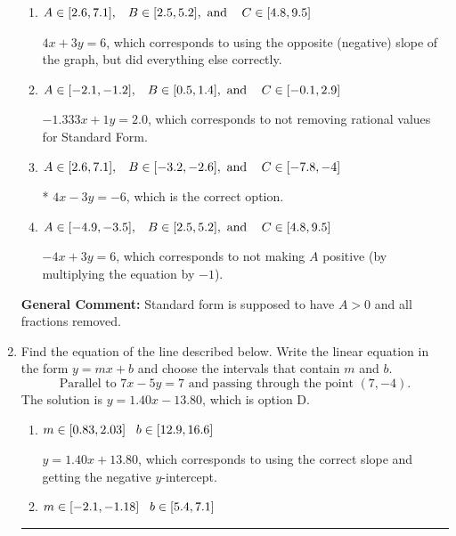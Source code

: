 \documentclass{extbook}[14pt]
\newcommand{\litem}[1]{\item #1

\rule{\textwidth}{0.4pt}}
\begin{document}
\begin{enumerate}
{\begin{enumerate}[label=\Alph*.]
 $-1.333x - 1y = -2.0$, which corresponds to using the opposite (negative) slope of the graph and not removing rational values.
\item \( A \in [2.6, 7.1], \hspace{3mm} B \in [2.5, 5.2], \text{ and } \hspace{3mm} C \in [4.8, 9.5] \)

 $4x + 3y = 6$, which corresponds to using the opposite (negative) slope of the graph, but did everything else correctly.
\item \( A \in [-2.1, -1.2], \hspace{3mm} B \in [0.5, 1.4], \text{ and } \hspace{3mm} C \in [-0.1, 2.9] \)

 $-1.333x + 1y = 2.0$, which corresponds to not removing rational values for Standard Form.
\item \( A \in [2.6, 7.1], \hspace{3mm} B \in [-3.2, -2.6], \text{ and } \hspace{3mm} C \in [-7.8, -4] \)

* $4x - 3y = -6$, which is the correct option.
\item \( A \in [-4.9, -3.5], \hspace{3mm} B \in [2.5, 5.2], \text{ and } \hspace{3mm} C \in [4.8, 9.5] \)

 $-4x + 3y = 6$, which corresponds to not making $A$ positive (by multiplying the equation by $-1$).
\end{enumerate}

\textbf{General Comment:} Standard form is supposed to have $A > 0$ and all fractions removed.
}
\litem{
Find the equation of the line described below. Write the linear equation in the form $ y=mx+b $ and choose the intervals that contain $m$ and $b$.
\[ \text{Parallel to } 7 x - 5 y = 7 \text{ and passing through the point } (7, -4). \]The solution is \( y = 1.40x - 13.80 \), which is option D.\begin{enumerate}[label=\Alph*.]
\item \( m \in [0.83, 2.03] \hspace*{3mm} b \in [12.9, 16.6] \)

 $y = 1.40x + 13.80$, which corresponds to using the correct slope and getting the negative $y$-intercept.
\item \( m \in [-2.1, -1.18] \hspace*{3mm} b \in [5.4, 7.1] \)


\end{enumerate}}
\end{enumerate}
\end{document}
